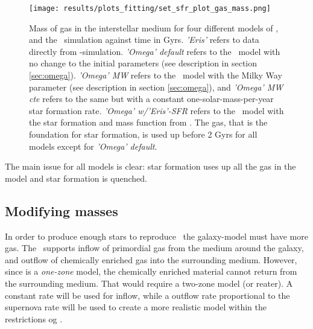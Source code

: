 \begin{figure}[h]
  \centering
  \texttt{[image: results/plots\_fitting/set\_sfr\_plot\_gas\_mass.png]}
  \caption{\label{img:fit-v0-gasmass}
    Mass of gas in the interstellar medium for four different models of \omegamodel, and the \eris\ simulation against time in Gyrs.
    \textit{'Eris'} refers to data directly from \eris -simulation. \textit{'Omega' default} refers to the \omegamodel\ model with no change to the initial parameters (see description in section \ref{sec:omega}). \textit{'Omega' MW} refers to the \omegamodel\ model with the Milky Way parameter (see description in section \ref{sec:omega}), and \textit{'Omega' MW cte} refers to the same but with a constant one-solar-mass-per-year star formation rate. \textit{'Omega' w/'Eris'-SFR} refers to the \omegamodel\ model with the star formation and mass function from \eris.
    The gas, that is the foundation for star formation, is used up before 2 Gyrs for all models except for \textit{'Omega' default}.
  }
\end{figure}
The main issue for all models is clear: star formation uses up all the gas in the model and star formation is quenched.

\iffalse %
\begin{figure}
  \centering
  \texttt{[image: \\imagefolder/set\_sfr\_plot\_spectro.png]}
  \caption{\label{fig:fit-v0-spectro} \comment{Explain each legend thouroughly}}
\end{figure}
\fi %

\FloatBarrier
\subsection{Modifying masses}
\iffalse
Filenames:
set_mass_1_plot_stellar_mass.png
set_mass_1_plot_total_mass.png    
set_mass_2_plot_stellar_mass.png  
set_mass_2_plot_total_mass.png    
set_mass_3_plot_sfr.png           
set_mass_3_plot_spectro_iron.png  
set_mass_3_plot_spectro_oxy.png   
set_mass_3_plot_stellar_mass.png  
set_mass_3_plot_total_mass.png
\fi
{}

In order to produce enough stars to reproduce \eris\ the galaxy-model must have more gas. The \omegamodel\ supports inflow of primordial gas from the medium around the galaxy, and outflow of chemically enriched gas into the surrounding medium. However, since \omegamodel is a \textit{one-zone} model, the chemically enriched material cannot return from the surrounding medium. That would require a two-zone model (or reater). A constant rate will be used for inflow, while a outflow rate proportional to the supernova rate will be used to create a more realistic model within the restrictions og \omegamodel.

